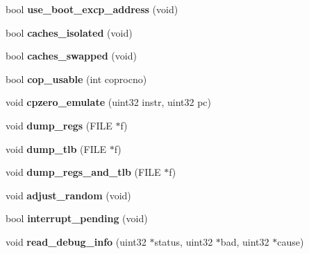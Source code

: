 \begin{DoxyCompactItemize}
\item 
\hypertarget{classCPZero_a92925ab954e16699c7cf01b934487927}{
bool {\bfseries use\_\-boot\_\-excp\_\-address} (void)}
\label{classCPZero_a92925ab954e16699c7cf01b934487927}

\item 
\hypertarget{classCPZero_ad27c7ba8138729180ed38c237788b8a4}{
bool {\bfseries caches\_\-isolated} (void)}
\label{classCPZero_ad27c7ba8138729180ed38c237788b8a4}

\item 
\hypertarget{classCPZero_a11fbfd1f5f3580e12590e0db1a52b0ce}{
bool {\bfseries caches\_\-swapped} (void)}
\label{classCPZero_a11fbfd1f5f3580e12590e0db1a52b0ce}

\item 
\hypertarget{classCPZero_afc99ae5fbd2e3e32f6982d10da788513}{
bool {\bfseries cop\_\-usable} (int coprocno)}
\label{classCPZero_afc99ae5fbd2e3e32f6982d10da788513}

\item 
\hypertarget{classCPZero_a177170b3404aca7a1adf655b22d06ef0}{
void {\bfseries cpzero\_\-emulate} (uint32 instr, uint32 pc)}
\label{classCPZero_a177170b3404aca7a1adf655b22d06ef0}

\item 
\hypertarget{classCPZero_aee1b391ace97d07fcd551133a6725ac2}{
void {\bfseries dump\_\-regs} (FILE $\ast$f)}
\label{classCPZero_aee1b391ace97d07fcd551133a6725ac2}

\item 
\hypertarget{classCPZero_a7b1425b75a48855fe10c88a7a01eab26}{
void {\bfseries dump\_\-tlb} (FILE $\ast$f)}
\label{classCPZero_a7b1425b75a48855fe10c88a7a01eab26}

\item 
\hypertarget{classCPZero_a2bf7aa14a71d8ae4ffb4a3f9c352e971}{
void {\bfseries dump\_\-regs\_\-and\_\-tlb} (FILE $\ast$f)}
\label{classCPZero_a2bf7aa14a71d8ae4ffb4a3f9c352e971}

\item 
\hypertarget{classCPZero_a343f7ad989439421dd250c1a81d37d4c}{
void {\bfseries adjust\_\-random} (void)}
\label{classCPZero_a343f7ad989439421dd250c1a81d37d4c}

\item 
\hypertarget{classCPZero_a566560627c3f4fab281a63944bf9ffc1}{
bool {\bfseries interrupt\_\-pending} (void)}
\label{classCPZero_a566560627c3f4fab281a63944bf9ffc1}

\item 
\hypertarget{classCPZero_a57001ba4feae636ec47c8b6593e00e74}{
void {\bfseries read\_\-debug\_\-info} (uint32 $\ast$status, uint32 $\ast$bad, uint32 $\ast$cause)}
\label{classCPZero_a57001ba4feae636ec47c8b6593e00e74}


\end{DoxyCompactItemize}
